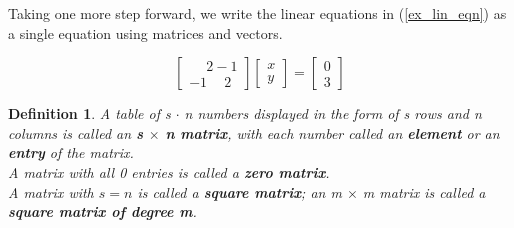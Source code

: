 \documentclass{article}
\newtheorem{definition}{Definition}[section] %
\begin{document}
Taking one more step forward, we write the linear equations in (\ref{ex_lin_eqn}) as a single equation using matrices and vectors.

\begin{center}
\begin{equation}
    \begin{bmatrix} \phantom{-} 2 -1 \\ -1 \phantom{-} 2 \end{bmatrix} \begin{bmatrix} x \\ y \end{bmatrix} = \begin{bmatrix} 0 \\ 3 \end{bmatrix}
\end{equation}
\end{center}

\begin{definition}
    A table of s $\cdot$ n numbers displayed in the form of s rows and n columns is called an \textbf{s $\times$ n matrix}, with each number called an \textbf{element} or an \textbf{entry} of the matrix. \\
    A matrix with all 0 entries is called a \textbf{zero matrix}. \\
    A matrix with $s=n$ is called a \textbf{square matrix}; an m $\times$ m matrix is called a \textbf{square matrix of degree m}.
\end{definition}
\end{document}
